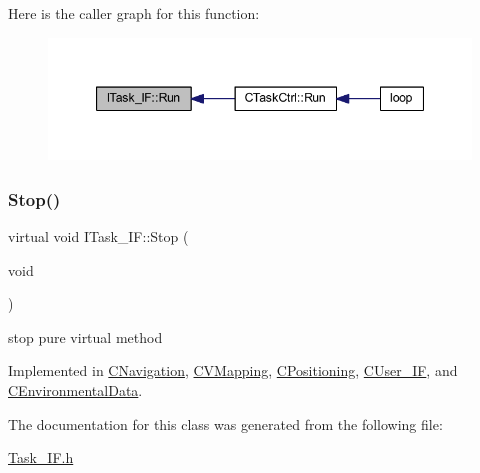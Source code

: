 Here is the caller graph for this function\+:
\nopagebreak
\begin{figure}[H]
\begin{center}
\leavevmode
\includegraphics[width=347pt]{class_i_task___i_f_ab73cc5879a61d00fc59b72cce32cc6f7_icgraph}
\end{center}
\end{figure}
\mbox{\label{class_i_task___i_f_af5f8fba86704c7e36d0e4681d58300c6}} 
\subsubsection{\texorpdfstring{Stop()}{Stop()}}
{\footnotesize\ttfamily virtual void I\+Task\+\_\+\+I\+F\+::\+Stop (\begin{DoxyParamCaption}\item[{void}]{ }\end{DoxyParamCaption})\hspace{0.3cm}{\ttfamily [pure virtual]}}



stop pure virtual method 



Implemented in \mbox{\hyperlink{class_c_navigation_a3cc8f7fdd003d6b2c5056b87ff93edd9}{C\+Navigation}}, \mbox{\hyperlink{class_c_v_mapping_ad4e34f79b444109d0cbf1223881126dc}{C\+V\+Mapping}}, \mbox{\hyperlink{class_c_positioning_a2706c9bb6bb52201c279386fd2c9dd89}{C\+Positioning}}, \mbox{\hyperlink{class_c_user___i_f_ae241b3296f4dd7810897ed8631ede880}{C\+User\+\_\+\+IF}}, and \mbox{\hyperlink{class_c_environmental_data_a61a8f487f013602aab4dadcf8a9da4c8}{C\+Environmental\+Data}}.



The documentation for this class was generated from the following file\+:\begin{DoxyCompactItemize}
\item 
\mbox{\hyperlink{_task___i_f_8h}{Task\+\_\+\+I\+F.\+h}}\end{DoxyCompactItemize}
